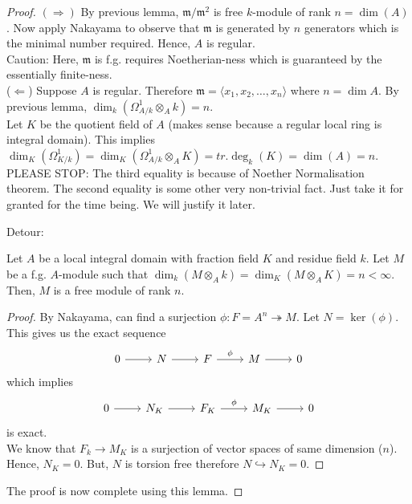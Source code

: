 \documentclass[oneside, 12pt]{scrbook}
\newcommand{\m}{\mathfrak{m}}
\theoremstyle{theorem}
\begin{document}
\begin{proof}
$( \Rightarrow )$ By previous lemma, $\m / \m^2$ is free $k$-module of rank $n = \dim(A)$. Now apply Nakayama to observe that $\m$ is generated by $n$ generators which is the minimal number required. Hence, $A$ is regular. \\
Caution: Here, $\m$ is f.g. requires Noetherian-ness which is guaranteed by the essentially finite-ness. \\

($\Leftarrow$)  Suppose $A$ is regular. Therefore $\m = \langle x_{1}, x_{2}, \hdots , x_{n}\rangle$ where $n = \dim A$. By previous lemma, $\dim_{k} (\Omega_{A/k}^{1} \otimes_{A} k ) = n$. \\

Let $K$ be the quotient field of $A$ (makes sense because a regular local ring is integral domain). This implies $\dim_{K}(\Omega_{K/k}^{1}) =\dim_{K}( \Omega_{A/k}^{1} \otimes_{A} K )= tr.\deg_{k}(K) = \dim(A) = n$. \\

\textcolor{BrickRed}{PLEASE STOP}: The third equality is because of Noether Normalisation theorem. The second equality is some other very non-trivial fact. Just take it for granted for the time being. We will justify it later. 

Detour: \\

\begin{lemma}
Let $A$ be a local integral domain with fraction field $K$ and residue field $k$. Let $M$ be a f.g. $A$-module such that $\dim_{k}(M \otimes_{A} k) = \dim_{K}(M \otimes_{A} K) = n < \infty$. Then, $M$ is a free module of rank $n$. 
\end{lemma}

\begin{proof}
By Nakayama, can find a surjection $\phi: F = A^n \twoheadrightarrow M$. Let $N  = \ker (\phi)$. This gives us the exact sequence
\[\begin{tikzcd}
	0 & N & F & M & 0
	\arrow[from=1-1, to=1-2]
	\arrow[from=1-2, to=1-3]
	\arrow["\phi", from=1-3, to=1-4]
	\arrow[from=1-4, to=1-5]
\end{tikzcd}\]
which implies \[\begin{tikzcd}
	0 & N_{K} & F_{K} & M_{K} & 0
	\arrow[from=1-1, to=1-2]
	\arrow[from=1-2, to=1-3]
	\arrow["\phi", from=1-3, to=1-4]
	\arrow[from=1-4, to=1-5]
\end{tikzcd}\] is exact. \\

We know that $F_{k} \rightarrow M_{K}$ is a surjection of vector spaces of same dimension ($n$). Hence, $N_{K}=0$. But, $N$ is torsion free therefore $N \hookrightarrow N_{K} =0$.
\end{proof}

The proof is now complete using this lemma.
\end{proof}
\end{document}
